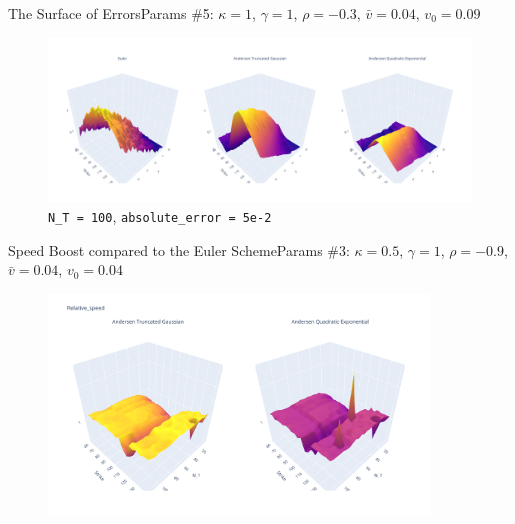 \begin{frame}{The Surface of Errors}{Params \#5: $\kappa = 1$, $\gamma = 1$, $\rho = -0.3$, $\bar v = 0.04$, $v_0 = 0.09$}
    \begin{figure}
        \includegraphics[width=\textwidth]{part4/pictures/err_surface_strike_T_N_T=100_param5.pdf}
        \caption{\texttt{N\_T = 100}, \texttt{absolute\_error = 5e-2}}
    \end{figure}
\end{frame}

\begin{frame}{Speed Boost compared to the Euler Scheme}{Params \#3: $\kappa = 0.5$, $\gamma = 1$, $\rho = -0.9$, $\bar v = 0.04$, $v_0 = 0.04$}
    \begin{figure}
        \includegraphics[width=0.9\textwidth]{part4/pictures/relative_speed_strike_N_T.pdf}
    \end{figure}
\end{frame}


